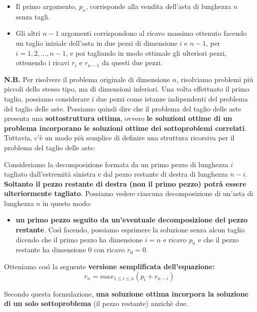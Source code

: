\begin{itemize}
  \item
        Il primo argomento, $p_n$, corrisponde alla vendita dell'asta di
        lunghezza $n$ senza tagli.
  \item
        Gli altri $n-1$ argomenti corrispondono al ricavo massimo ottenuto
        facendo un taglio iniziale dell'asta in due pezzi di dimensione $i$
        e $n-1$, per $i = 1, 2, \ldots, n-1$, e poi tagliando in modo
        ottimale gli ulteriori pezzi, ottenendo i ricavi $r_i$ e $r_{n-1}$
        da questi due pezzi.
\end{itemize}

\textbf{N.B.} Per risolvere il problema originale di dimensione $n$,
risolviamo problemi più piccoli dello stesso tipo, ma di dimensioni
inferiori. Una volta effettuato il primo taglio, possiamo considerare i
due pezzi come istanze indipendenti del problema del taglio delle aste.
Possiamo quindi dire che il problema del taglio delle aste presenta una
\textbf{sottostruttura ottima}, ovvero \textbf{le soluzioni ottime di un
  problema incorporano le soluzioni ottime dei sottoproblemi correlati}.\\

Tuttavia, c'è un modo più semplice di definire una struttura ricorsiva
per il problema del taglio delle aste:
\begin{myblockquote}
  Consideriamo la
  decomposizione formata da un primo pezzo di lunghezza $i$ tagliato
  dall'estremità sinistra e dal pezzo restante di destra di lunghezza
  $n-i$. \textbf{Soltanto il pezzo restante di destra (non il primo
    pezzo) potrà essere ulteriormente tagliato}. Possiamo vedere ciascuna
  decomposizione di un'asta di lunghezza $n$ in questo modo:
  \begin{itemize}
    \item \textbf{un primo pezzo seguito da un'eventuale
            decomposizione del pezzo restante}.  Così facendo,
          possiamo esprimere la soluzione senza alcun taglio dicendo che il primo
          pezzo ha dimensione $i = n$ e ricavo $p_n$ e che il pezzo restante
          ha dimensione 0 con ricavo $r_0 = 0$.
  \end{itemize}
\end{myblockquote}

Otteniamo così la seguente \textbf{versione semplificata
  dell'equazione:}
$$
  r_n = max_{1 \le i \le n}(p_i + r_{n-i})
$$

Secondo questa formulazione, \textbf{una soluzione ottima incorpora la
  soluzione di un solo sottoproblema} (il pezzo restante) anzichè due.

